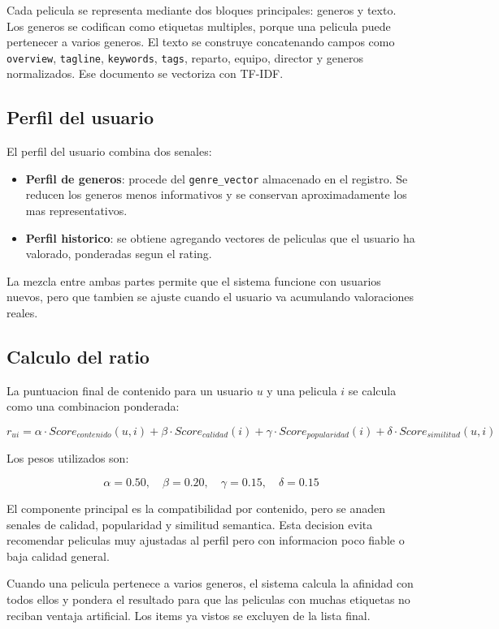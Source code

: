 \documentclass[12pt,a4paper]{article}
\begin{document}
Cada pelicula se representa mediante dos bloques principales: generos y texto. Los generos se codifican como etiquetas multiples, porque una pelicula puede pertenecer a varios generos. El texto se construye concatenando campos como \texttt{overview}, \texttt{tagline}, \texttt{keywords}, \texttt{tags}, reparto, equipo, director y generos normalizados. Ese documento se vectoriza con TF-IDF.

\subsection{Perfil del usuario}

El perfil del usuario combina dos senales:

\begin{itemize}[leftmargin=*]
\item \textbf{Perfil de generos}: procede del \texttt{genre\_vector} almacenado en el registro. Se reducen los generos menos informativos y se conservan aproximadamente los mas representativos.
\item \textbf{Perfil historico}: se obtiene agregando vectores de peliculas que el usuario ha valorado, ponderadas segun el rating.
\end{itemize}

La mezcla entre ambas partes permite que el sistema funcione con usuarios nuevos, pero que tambien se ajuste cuando el usuario va acumulando valoraciones reales.

\subsection{Calculo del ratio}

La puntuacion final de contenido para un usuario $u$ y una pelicula $i$ se calcula como una combinacion ponderada:

\[
r_{ui} =
\alpha \cdot Score_{contenido}(u,i) +
\beta \cdot Score_{calidad}(i) +
\gamma \cdot Score_{popularidad}(i) +
\delta \cdot Score_{similitud}(u,i)
\]

Los pesos utilizados son:

\[
\alpha = 0.50,\quad \beta = 0.20,\quad \gamma = 0.15,\quad \delta = 0.15
\]

El componente principal es la compatibilidad por contenido, pero se anaden senales de calidad, popularidad y similitud semantica. Esta decision evita recomendar peliculas muy ajustadas al perfil pero con informacion poco fiable o baja calidad general.

Cuando una pelicula pertenece a varios generos, el sistema calcula la afinidad con todos ellos y pondera el resultado para que las peliculas con muchas etiquetas no reciban ventaja artificial. Los items ya vistos se excluyen de la lista final.
\end{document}
